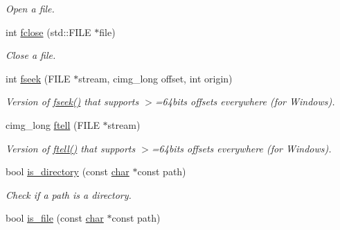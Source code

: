 \begin{DoxyCompactItemize}
\begin{DoxyCompactList}\small\item\em Open a file. \end{DoxyCompactList}\item 
int \hyperlink{namespacecimg__library__suffixed_1_1cimg_ac436b94e6ffef5fd420bb3d7c05fd416}{fclose} (std\+::\+F\+I\+LE $\ast$file)
\begin{DoxyCompactList}\small\item\em Close a file. \end{DoxyCompactList}\item 
\mbox{\label{namespacecimg__library__suffixed_1_1cimg_a03dbe74029b194eca4b86c10e9fbd1fc}} 
int \hyperlink{namespacecimg__library__suffixed_1_1cimg_a03dbe74029b194eca4b86c10e9fbd1fc}{fseek} (F\+I\+LE $\ast$stream, cimg\+\_\+long offset, int origin)
\begin{DoxyCompactList}\small\item\em Version of \textquotesingle{}\hyperlink{namespacecimg__library__suffixed_1_1cimg_a03dbe74029b194eca4b86c10e9fbd1fc}{fseek()}\textquotesingle{} that supports $>$=64bits offsets everywhere (for Windows). \end{DoxyCompactList}\item 
\mbox{\label{namespacecimg__library__suffixed_1_1cimg_a6fe7b32c5cfeef7ec973b4cbb538683a}} 
cimg\+\_\+long \hyperlink{namespacecimg__library__suffixed_1_1cimg_a6fe7b32c5cfeef7ec973b4cbb538683a}{ftell} (F\+I\+LE $\ast$stream)
\begin{DoxyCompactList}\small\item\em Version of \textquotesingle{}\hyperlink{namespacecimg__library__suffixed_1_1cimg_a6fe7b32c5cfeef7ec973b4cbb538683a}{ftell()}\textquotesingle{} that supports $>$=64bits offsets everywhere (for Windows). \end{DoxyCompactList}\item 
bool \hyperlink{namespacecimg__library__suffixed_1_1cimg_aca0e45a04eb1607f2e25101aae4b8572}{is\+\_\+directory} (const \hyperlink{classchar}{char} $\ast$const path)
\begin{DoxyCompactList}\small\item\em Check if a path is a directory. \end{DoxyCompactList}\item 
bool \hyperlink{namespacecimg__library__suffixed_1_1cimg_ad6c9ae2aaaf60bdecbd5c8f57ee5617e}{is\+\_\+file} (const \hyperlink{classchar}{char} $\ast$const path)

\end{DoxyCompactItemize}
